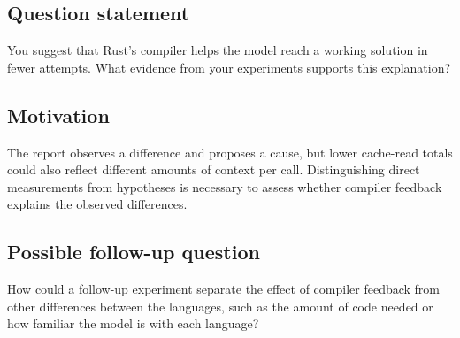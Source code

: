 \documentclass[11pt,a4paper]{extarticle}
\newcommand{\response}[1]{%
  {\color{responsegray}\fontsize{10.5}{11.8}\selectfont #1\par}\vspace{5pt}%
}
\begin{document}
\subsection*{Question statement}
\response{You suggest that Rust's compiler helps the model reach a working solution in fewer attempts. What evidence from your experiments supports this explanation?}

\subsection*{Motivation}
\response{The report observes a difference and proposes a cause, but lower cache-read totals could also reflect different amounts of context per call. Distinguishing direct measurements from hypotheses is necessary to assess whether compiler feedback explains the observed differences.}

\subsection*{Possible follow-up question}
\response{How could a follow-up experiment separate the effect of compiler feedback from other differences between the languages, such as the amount of code needed or how familiar the model is with each language?}
\end{document}
